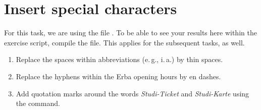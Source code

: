\section{Insert special characters}

For this task, we are using the file .
To be able to see your results here within the exercise script,
compile the  file.
This applies for the subsequent tasks, as well.

\begin{enumerate}
	\item Replace the spaces within abbreviations (e.\,g., i.\,a.) by thin spaces.
	\item Replace the hyphens within the Erba opening hours by en dashes.
	\item Add quotation marks around the words \emph{Studi-Ticket} and 
	\emph{Studi-Karte} using the  command. 
\end{enumerate}
